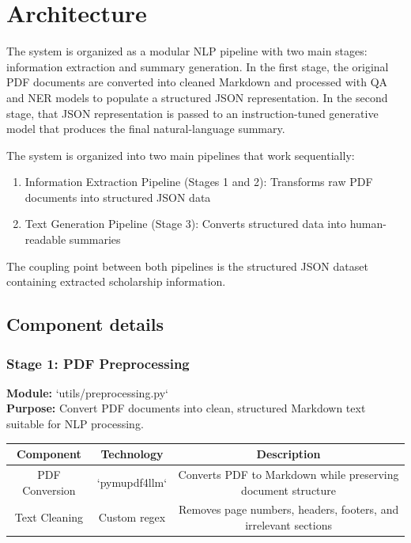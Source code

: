 \documentclass{article}
\begin{document}
\section{Architecture}

The system is organized as a modular NLP pipeline with two main stages: information extraction and summary generation. In the first stage, the original PDF documents are converted into cleaned Markdown and processed with QA and NER models to populate a structured JSON representation. In the second stage, that JSON representation is passed to an instruction-tuned generative model that produces the final natural-language summary.

The system is organized into two main pipelines that work sequentially:

\begin{enumerate}
\item Information Extraction Pipeline (Stages 1 and 2): Transforms raw PDF documents into structured JSON data
\item Text Generation Pipeline (Stage 3): Converts structured data into human-readable summaries
\end{enumerate}
The coupling point between both pipelines is the structured JSON dataset containing extracted scholarship information.

\subsection{Component details}

\subsubsection{Stage 1: PDF Preprocessing}

\textbf{Module:} `utils/preprocessing.py` \\
\textbf{Purpose:} Convert PDF documents into clean, structured Markdown text suitable for NLP processing.

\begin{center}
\begin{tabular}{ |c|c|c| } 
 \hline
Component & Technology & Description \\
 \hline\hline
 PDF Conversion & `pymupdf4llm` & Converts PDF to Markdown while preserving document structure \\ 
 Text Cleaning & Custom regex & Removes page numbers, headers, footers, and irrelevant sections \\
 \hline
\end{tabular}
\end{center}
\end{document}
